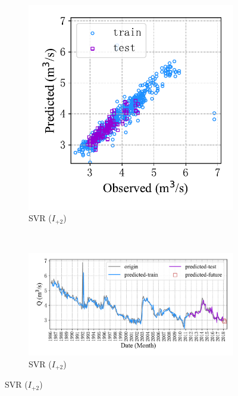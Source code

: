 \begin{figure}[!htbp]
\begin{subfigure}[b]{0.615\textwidth}
  \end{subfigure}
  \\
  \begin{subfigure}[b]{0.305\textwidth}
    \includegraphics[width=\textwidth]{Img/chap4_spr/out2/spr_scatter_in_2_out_2_svr.pdf}
    \vspace{-1.2cm}
    \caption{SVR ($I_{+2}$)}
    \label{fig:spr_scatter_in_2_out_2_svr}
  \end{subfigure}
  ~
  \begin{subfigure}[b]{0.615\textwidth}
    \includegraphics[width=\textwidth]{Img/chap4_spr/out2/spr_series_in_2_out_2_svr.pdf}
    \vspace{-1.2cm}
    \caption{SVR ($I_{+2}$)}
    \label{fig:spr_series_in_2_out_2_svr}

\end{subfigure}
\end{figure}
